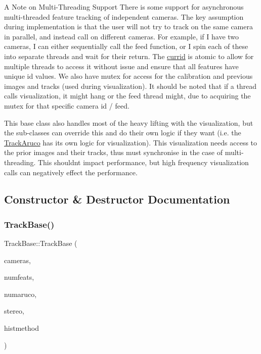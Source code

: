 \begin{DoxyParagraph}{A Note on Multi-\/\+Threading Support}
There is some support for asynchronous multi-\/threaded feature tracking of independent cameras. The key assumption during implementation is that the user will not try to track on the same camera in parallel, and instead call on different cameras. For example, if I have two cameras, I can either sequentially call the feed function, or I spin each of these into separate threads and wait for their return. The \hyperlink{classov__core_1_1TrackBase_af59db0441bf16f0e7c62d8f3bd09e5f0}{currid} is atomic to allow for multiple threads to access it without issue and ensure that all features have unique id values. We also have mutex for access for the calibration and previous images and tracks (used during visualization). It should be noted that if a thread calls visualization, it might hang or the feed thread might, due to acquiring the mutex for that specific camera id / feed.
\end{DoxyParagraph}
This base class also handles most of the heavy lifting with the visualization, but the sub-\/classes can override this and do their own logic if they want (i.\+e. the \hyperlink{classov__core_1_1TrackAruco}{Track\+Aruco} has its own logic for visualization). This visualization needs access to the prior images and their tracks, thus must synchronise in the case of multi-\/threading. This shouldn\textquotesingle{}t impact performance, but high frequency visualization calls can negatively effect the performance. 

\subsection{Constructor \& Destructor Documentation}
\mbox{\label{classov__core_1_1TrackBase_a645127d6e03e66b96959ececccb3ffc0}} 
\subsubsection{\texorpdfstring{Track\+Base()}{TrackBase()}}
{\footnotesize\ttfamily Track\+Base\+::\+Track\+Base (\begin{DoxyParamCaption}\item[{std\+::unordered\+\_\+map$<$ size\+\_\+t, std\+::shared\+\_\+ptr$<$ \hyperlink{classov__core_1_1CamBase}{Cam\+Base} $>$$>$}]{cameras,  }\item[{int}]{numfeats,  }\item[{int}]{numaruco,  }\item[{bool}]{stereo,  }\item[{\hyperlink{classov__core_1_1TrackBase_aa4b34a5dce99b59522d57bf9278c9a1a}{Histogram\+Method}}]{histmethod }\end{DoxyParamCaption})}



